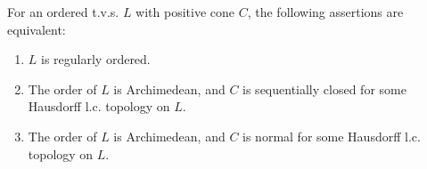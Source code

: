 For an ordered t.v.s. $L$ with positive cone $C$, the following assertions are equivalent:
\begin{enumerate}
  \item[(a)] $L$ is regularly ordered.
  \item[(b)] The order of $L$ is Archimedean, and $C$ is sequentially closed for some Hausdorff l.c. topology on $L$.
  \item[(c)] The order of $L$ is Archimedean, and $C$ is normal for some Hausdorff l.c. topology on $L$.
\end{enumerate}

